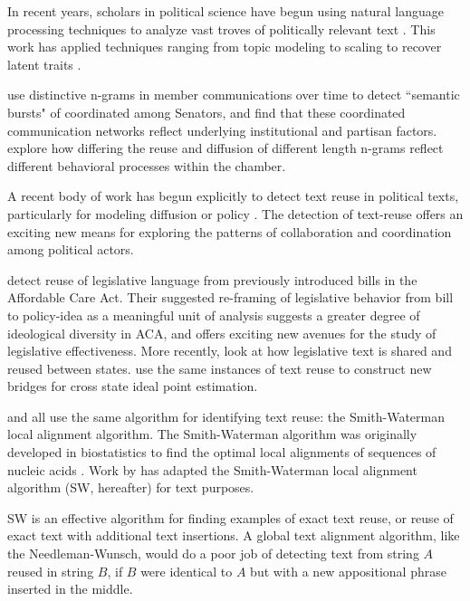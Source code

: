 \documentclass[11pt]{article}
\begin{document}
\begin{flushleft}
In recent years, scholars in political science have begun using natural language processing techniques to analyze vast troves of politically relevant text \citep{grimmer2013text}. This work has applied techniques ranging from topic modeling \citep{roberts2014structural} to scaling to recover latent traits \citep{lowe2013validating}. 

\cite{lin2014burst} use distinctive n-grams in member communications over time to detect ``semantic bursts" of coordinated among Senators, and find that these coordinated communication networks reflect underlying institutional and partisan factors. \cite{lin2015uncovering} explore how differing the reuse and diffusion of different length n-grams reflect different behavioral processes within the chamber.

A recent body of work has begun explicitly to detect text reuse in political texts, particularly for modeling diffusion or policy \citep{smith2013infectious,smith2014detecting, wilkerson2015tracing, Furnas2017ideal, Fridolin2017text}. The detection of text-reuse offers an exciting new means for exploring the patterns of collaboration and coordination among political actors. 

\cite{wilkerson2015tracing} detect reuse of legislative language from previously introduced bills in the Affordable Care Act. Their suggested re-framing of legislative behavior from bill to policy-idea as a meaningful unit of analysis suggests a greater degree of ideological diversity in ACA, and offers exciting new avenues for the study of legislative effectiveness. More recently, \cite{burgess2016legislative,Fridolin2017text} look at how legislative text is shared and reused between states. \cite{Furnas2017ideal} use the same instances of text reuse to construct new bridges for cross state ideal point estimation.

\cite{wilkerson2015tracing, burgess2016legislative,Fridolin2017text} and \cite{Furnas2017ideal} all use the same algorithm for identifying text reuse: the Smith-Waterman local alignment algorithm. The Smith-Waterman algorithm was originally developed in biostatistics to find the optimal local alignments of sequences of nucleic acids \cite{smith1981identification}. Work by\cite{smith2013infectious,smith2014detecting} has adapted the Smith-Waterman local alignment algorithm (SW, hereafter) for text purposes.


SW is an effective algorithm for finding examples of exact text reuse, or reuse of exact text with additional text insertions. A global text alignment algorithm, like the Needleman-Wunsch, would do a poor job of detecting text from string $A$ reused in string $B$, if $B$ were identical to $A$ but with a new appositional phrase inserted in the middle\cite{needleman1970general}. 


\end{flushleft}
\end{document}
